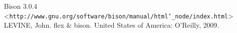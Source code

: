 \begin{thebibliography}{9}


		Bison 3.0.4 \\
		\textless\texttt{http://www.gnu.org/software/bison/manual/html\char`_node/index.html}\textgreater\\

		LEVINE, John. flex \& bison. United States of America: O'Reilly, 2009.


\end{thebibliography}

